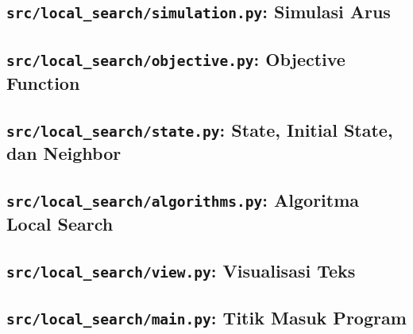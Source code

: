 \documentclass[11pt,a4paper]{article}
\begin{document}

\subsection{\texttt{src/local\_search/simulation.py}: Simulasi Arus}


\subsection{\texttt{src/local\_search/objective.py}: Objective Function}


\subsection{\texttt{src/local\_search/state.py}: State, Initial State, dan Neighbor}


\subsection{\texttt{src/local\_search/algorithms.py}: Algoritma Local Search}


\subsection{\texttt{src/local\_search/view.py}: Visualisasi Teks}


\subsection{\texttt{src/local\_search/main.py}: Titik Masuk Program}

\end{document}

